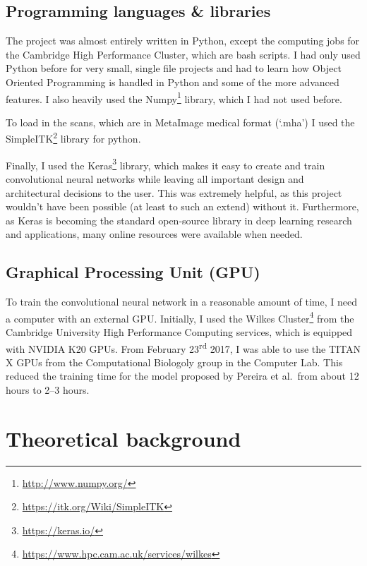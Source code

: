\documentclass[12pt,a4paper,twoside,openright]{report}
\begin{document}
\subsection{Programming languages \& libraries}
The project was almost entirely written in Python, except the computing jobs for the Cambridge High Performance Cluster, which are bash scripts. I had only used Python before for very small, single file projects and had to learn how Object Oriented Programming is handled in Python and some of the more advanced features. I also heavily used the Numpy\footnote{\url{http://www.numpy.org/}} library, which I had not used before.

To load in the scans, which are in MetaImage medical format (`.mha') I used the SimpleITK\footnote{\url{https://itk.org/Wiki/SimpleITK}} library for python.

Finally, I used the Keras\footnote{\url{https://keras.io/}} library, which makes it easy to create and train convolutional neural networks while leaving all important design and architectural decisions to the user. This was extremely helpful, as this project wouldn't have been possible (at least to such an extend) without it. Furthermore, as Keras is becoming the standard open-source library in deep learning research and applications, many online resources were available when needed.

\subsection{Graphical Processing Unit (GPU)}
To train the convolutional neural network in a reasonable amount of time, I need a computer with an external GPU. Initially, I used the Wilkes Cluster\footnote{\url{https://www.hpc.cam.ac.uk/services/wilkes}} from the Cambridge University High Performance Computing services, which is equipped with NVIDIA K20 GPUs. From February 23\textsuperscript{rd} 2017, I was able to use the TITAN X GPUs from the Computational Biologoly group in the Computer Lab. This reduced the training time for the model proposed by Pereira et al.\ from about 12 hours to 2--3 hours.


\section{Theoretical background}
\end{document}
